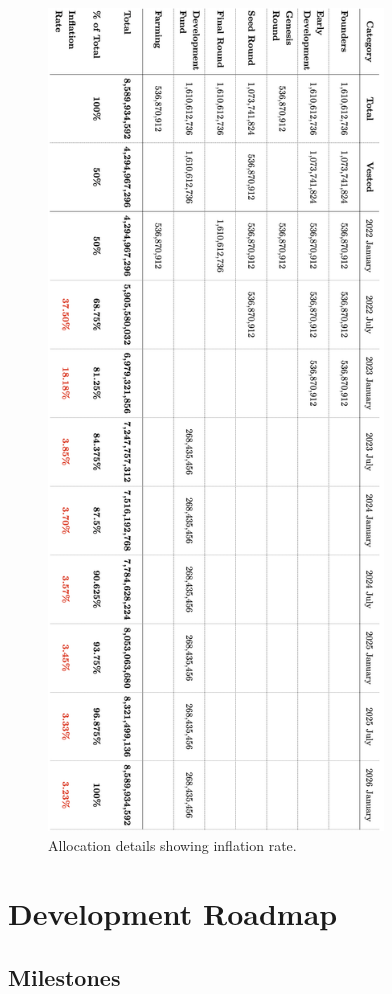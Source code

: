 \documentclass[12pt]{article}
\begin{document}
\begin{figure}[H]
\centering
  \includegraphics[width=3.5in]{images/The_Unit_Allocation_Table_2.png}
  \caption{Allocation details showing inflation rate.}
  \label{fig:allocation_table2}
\end{figure}






\section{Development Roadmap}


\subsection{Milestones}
\end{document}

